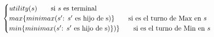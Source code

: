 \documentclass[preview]{standalone}
\begin{document}
\begin{align*}
\begin{cases}
                                 utility(s) \qquad \text{si $s$ es terminal} \cr
                                 max\{minimax(\text{$s'$: $s'$ es hijo de }$s$)\}\qquad \text{si es el turno de Max en $s$} \cr
                                 min\{minimax(\text{$s'$: $s'$ es hijo de }$s$)\})\}\qquad \text{si es el turno de Min en $s$} \cr
                                 \end{cases}
\end{align*}
\end{document}
